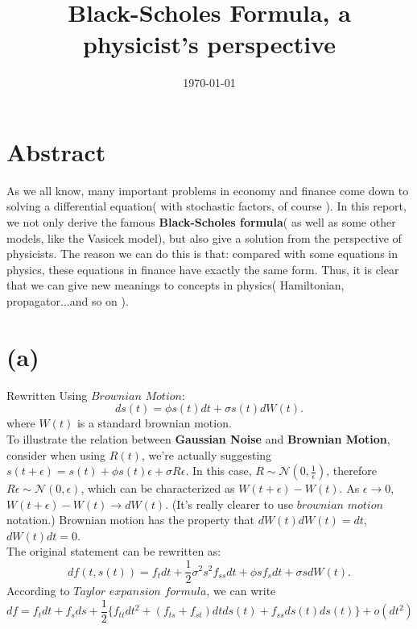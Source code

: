 \documentclass[12pt,a4paper]{paper}
\title{Black-Scholes Formula, a physicist's perspective}
\author{}
\date{\today}
\begin{document}
\maketitle
\section {Abstract}
\indent As we all know, many important problems in economy and finance come down to solving a differential equation( with stochastic factors, of course ). In this report, we not only derive the famous \textbf{Black-Scholes formula}( as well as some other models, like the Vasicek model), but also give a solution from the perspective of physicists. The reason we can do this is that: compared with some equations in physics, these equations in finance have exactly the same form. Thus, it is clear that we can give new meanings to concepts in physics( Hamiltonian, propagator...and so on ).
\section{(a)}
Rewritten Using $Brownian$ $Motion$: 
\begin{equation}
ds(t) = \phi s(t) dt + \sigma s(t) dW(t).
\end{equation}
where $W(t)$ is a standard brownian motion.\\\indent To illustrate the relation between \textbf{Gaussian Noise} and \textbf{Brownian Motion}, consider when using $R(t)$, we're actually suggesting $s(t + \epsilon) = s(t) + \phi s(t) \epsilon + \sigma R \epsilon$. In this case, $R \sim \mathcal{N}(0, \frac{1}{\epsilon})$, therefore $R \epsilon \sim \mathcal{N}(0, \epsilon)$, which can be characterized as $W(t + \epsilon) - W(t)$. As $\epsilon \rightarrow 0$, $W(t + \epsilon) - W(t) \rightarrow dW(t)$. (It's really clearer to use $brownian$ $motion$ notation.) Brownian motion has the property that $dW(t)dW(t) = dt$, $dW(t) dt = 0$.\\
\indent The original statement can be rewritten as: 
\begin{equation}
df(t, s(t)) = f_t dt + \frac{1}{2}\sigma^2s^2f_{ss}dt + \phi s f_s dt + \sigma s dW(t).
\end{equation}
\indent According to $Taylor$ $expansion$ $formula$, we can write
\begin{equation} 
df = f_t dt + f_s ds + \frac{1}{2}\{f_{tt} dt^2 + (f_{ts} + f_{st})dt ds(t) + f_{ss} ds(t)ds(t) \} + o(dt^2)
\end{equation} 
\end{document}
